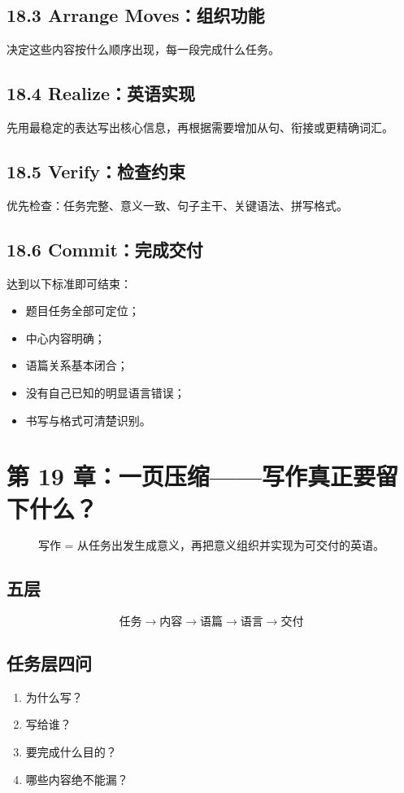 \documentclass[11pt,a4paper]{ctexart}
\begin{document}
\subsection{18.3 Arrange Moves：组织功能}
决定这些内容按什么顺序出现，每一段完成什么任务。

\subsection{18.4 Realize：英语实现}
先用最稳定的表达写出核心信息，再根据需要增加从句、衔接或更精确词汇。

\subsection{18.5 Verify：检查约束}
优先检查：任务完整、意义一致、句子主干、关键语法、拼写格式。

\subsection{18.6 Commit：完成交付}
达到以下标准即可结束：
\begin{itemize}
  \item 题目任务全部可定位；
  \item 中心内容明确；
  \item 语篇关系基本闭合；
  \item 没有自己已知的明显语言错误；
  \item 书写与格式可清楚识别。
\end{itemize}

\newpage
\section{第 19 章：一页压缩——写作真正要留下什么？}

\begin{corebox}[总母模型]
\[
\boxed{
\textbf{写作 = 从任务出发生成意义，再把意义组织并实现为可交付的英语。}
}
\]
\end{corebox}

\subsection{五层}
\[
\boxed{
\text{任务}
\rightarrow
\text{内容}
\rightarrow
\text{语篇}
\rightarrow
\text{语言}
\rightarrow
\text{交付}
}
\]

\subsection{任务层四问}
\begin{enumerate}
  \item 为什么写？
  \item 写给谁？
  \item 要完成什么目的？
  \item 哪些内容绝不能漏？
\end{enumerate}
\end{document}
